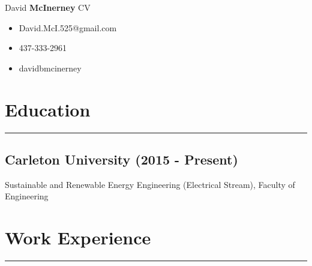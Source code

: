 \documentclass[11pt]{article}
\begin{document}
	\def\arraystretch{1.3}	 %
	\begin{minipage}[b]{0.6\textwidth}
	\begin{flushleft}
	{\noindent \Huge David \textbf{McInerney} CV}
	\end{flushleft}	 
	\end{minipage}
	\begin{minipage}[b]{0.32\textwidth}
	\begin{itemize}
		\item David.McI.525@gmail.com
		\item 437-333-2961
    		\item davidbmcinerney
	\end{itemize}

	\end{minipage}
	
	\section{Education}
		\hrule \hfill %
		\subsection{Carleton University (2015 - Present)}
		\noindent Sustainable and Renewable Energy Engineering (Electrical Stream), Faculty of Engineering 
	
	\section{Work Experience}
		\hrule \hfill %
\end{document}
